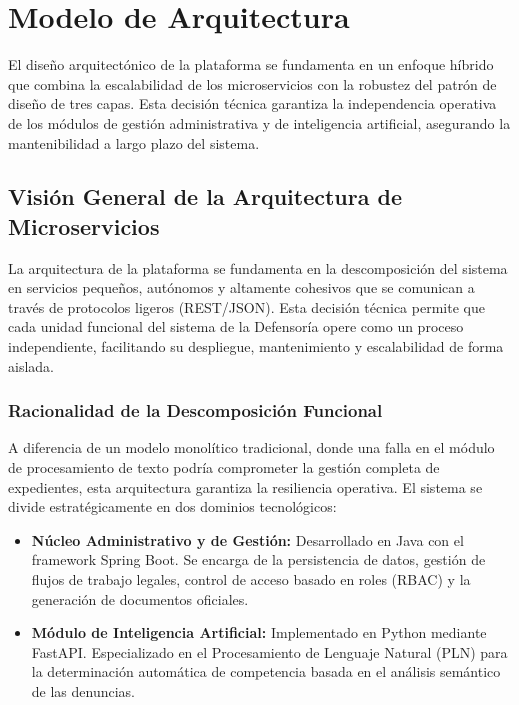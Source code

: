 \section{Modelo de Arquitectura}

El diseño arquitectónico de la plataforma se fundamenta en un enfoque híbrido que combina la escalabilidad de los microservicios con la robustez del patrón de diseño de tres capas. Esta decisión técnica garantiza la independencia operativa de los módulos de gestión administrativa y de inteligencia artificial, asegurando la mantenibilidad a largo plazo del sistema.

\subsection{Visión General de la Arquitectura de Microservicios}

La arquitectura de la plataforma se fundamenta en la descomposición del sistema en servicios pequeños, autónomos y altamente cohesivos que se comunican a través de protocolos ligeros (REST/JSON). Esta decisión técnica permite que cada unidad funcional del sistema de la Defensoría opere como un proceso independiente, facilitando su despliegue, mantenimiento y escalabilidad de forma aislada.

\subsubsection*{Racionalidad de la Descomposición Funcional}
A diferencia de un modelo monolítico tradicional, donde una falla en el módulo de procesamiento de texto podría comprometer la gestión completa de expedientes, esta arquitectura garantiza la resiliencia operativa. El sistema se divide estratégicamente en dos dominios tecnológicos:

\begin{itemize}
    \item \textbf{Núcleo Administrativo y de Gestión:} Desarrollado en Java con el framework Spring Boot. Se encarga de la persistencia de datos, gestión de flujos de trabajo legales, control de acceso basado en roles (RBAC) y la generación de documentos oficiales.
    \item \textbf{Módulo de Inteligencia Artificial:} Implementado en Python mediante FastAPI. Especializado en el Procesamiento de Lenguaje Natural (PLN) para la determinación automática de competencia basada en el análisis semántico de las denuncias.
\end{itemize}


